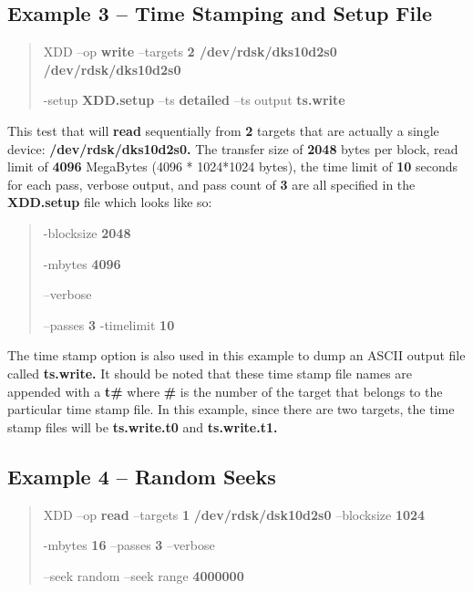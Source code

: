 \subsection{Example 3 -- Time Stamping and Setup File}\label{example-3-time-stamping-and-setup-file}

\begin{quote}
XDD --op \textbf{write} --targets \textbf{2 /dev/rdsk/dks10d2s0 /dev/rdsk/dks10d2s0}

-setup \textbf{XDD.setup} --ts \textbf{detailed} --ts output \textbf{ts.write}
\end{quote}

This test that will \textbf{read} sequentially from \textbf{2} targets that are actually a single device: \textbf{/dev/rdsk/dks10d2s0.} The transfer size of \textbf{2048} bytes per block, read limit of \textbf{4096} MegaBytes (4096 * 1024*1024 bytes), the time limit of \textbf{10} seconds for each pass, verbose output, and pass count of \textbf{3} are all specified in the \textbf{XDD.setup} file which looks like so:

\begin{quote}
-blocksize \textbf{2048}

-mbytes \textbf{4096}

--verbose

--passes \textbf{3} -timelimit \textbf{10}
\end{quote}

The time stamp option is also used in this example to dump an ASCII output file called \textbf{ts.write.} It should be noted that these time stamp file names are appended with a \textbf{t\#} where \textbf{\#} is the number of the target that belongs to the particular time stamp file. In this example, since there are two targets, the time stamp files will be \textbf{ts.write.t0} and \textbf{ts.write.t1.}

\subsection{\texorpdfstring{Example 4 -- Random Seeks }{Example 4 -- Random Seeks }}\label{example-4-random-seeks}

\begin{quote}
XDD --op \textbf{read} --targets \textbf{1} \textbf{/dev/rdsk/dsk10d2s0} --blocksize \textbf{1024}

-mbytes \textbf{16} --passes \textbf{3} --verbose

--seek random --seek range \textbf{4000000}
\end{quote}

